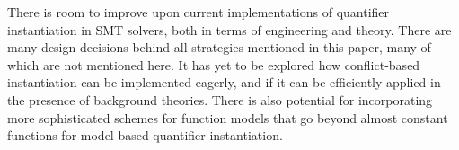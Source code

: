 \documentclass{easychair}
\begin{document}

There is room to improve upon current implementations of quantifier instantiation in SMT solvers,
both in terms of engineering and theory.
There are many design decisions behind all strategies mentioned in this paper, 
many of which are not mentioned here.
It has yet to be explored how conflict-based instantiation can be implemented eagerly,
and if it can be efficiently applied in the presence of background theories.
There is also potential for incorporating more sophisticated schemes for function models that go beyond almost constant functions
for model-based quantifier instantiation.
\end{document}
